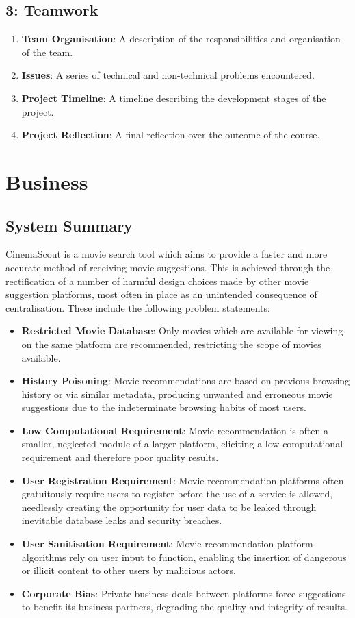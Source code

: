 \documentclass{article}
\begin{document}
\subsection*{3: Teamwork}
\begin{enumerate}
\item \textbf{Team Organisation}: A description of the responsibilities and
organisation of the team.
\item \textbf{Issues}: A series of technical and non-technical problems
encountered.
\item \textbf{Project Timeline}: A timeline describing the development stages
of the project.
\item \textbf{Project Reflection}: A final reflection over the outcome of the
course.
\end{enumerate}

\section{Business}
\subsection{System Summary}
CinemaScout is a movie search tool which aims to provide a faster and more
accurate method of receiving movie suggestions. This is achieved 
through the rectification of a number of harmful design choices made by other 
movie suggestion platforms, most often in place as an unintended consequence 
of centralisation. These include the following problem statements:
\begin{itemize}
\item \textbf{Restricted Movie Database}: Only movies which are available for
viewing on the same platform are recommended, restricting the scope of movies
available.
\item \textbf{History Poisoning}: Movie recommendations are based on previous
browsing history or via similar metadata, producing unwanted and erroneous
movie suggestions due to the indeterminate browsing habits of most users.
\item \textbf{Low Computational Requirement}: Movie recommendation is often a
smaller, neglected module of a larger platform, eliciting a low computational 
requirement and therefore poor quality results.
\item \textbf{User Registration Requirement}: Movie recommendation platforms
often gratuitously require users to register before the use of a service is
allowed, needlessly creating the opportunity for user data to be leaked through
inevitable database leaks and security breaches.
\item \textbf{User Sanitisation Requirement}: Movie recommendation platform
algorithms rely on user input to function, enabling the insertion of dangerous
or illicit content to other users by malicious actors.
\item \textbf{Corporate Bias}: Private business deals between platforms force
suggestions to benefit its business partners, degrading the quality and
integrity of results.
\end{itemize}
\end{document}

